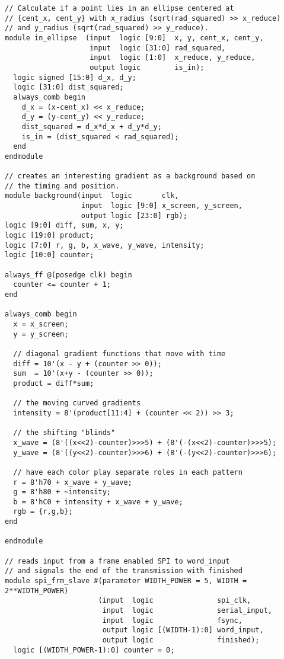 \documentclass{article}
\begin{document}
\begin{verbatim}
// Calculate if a point lies in an ellipse centered at 
// {cent_x, cent_y} with x_radius (sqrt(rad_squared) >> x_reduce)
// and y_radius (sqrt(rad_squared) >> y_reduce).
module in_ellipse  (input  logic [9:0]  x, y, cent_x, cent_y,
                    input  logic [31:0] rad_squared,
                    input  logic [1:0]  x_reduce, y_reduce,
                    output logic        is_in);
  logic signed [15:0] d_x, d_y;
  logic [31:0] dist_squared;
  always_comb begin
    d_x = (x-cent_x) << x_reduce;
    d_y = (y-cent_y) << y_reduce;
    dist_squared = d_x*d_x + d_y*d_y;
    is_in = (dist_squared < rad_squared);
  end
endmodule

// creates an interesting gradient as a background based on
// the timing and position.
module background(input  logic       clk,
                  input  logic [9:0] x_screen, y_screen,
                  output logic [23:0] rgb);
logic [9:0] diff, sum, x, y;
logic [19:0] product; 
logic [7:0] r, g, b, x_wave, y_wave, intensity;
logic [10:0] counter;

always_ff @(posedge clk) begin
  counter <= counter + 1;
end

always_comb begin
  x = x_screen;
  y = y_screen;
  
  // diagonal gradient functions that move with time
  diff = 10'(x - y + (counter >> 0));
  sum  = 10'(x+y - (counter >> 0));
  product = diff*sum;
  
  // the moving curved gradients
  intensity = 8'(product[11:4] + (counter << 2)) >> 3;
  
  // the shifting "blinds" 
  x_wave = (8'((x<<2)-counter)>>>5) + (8'(-(x<<2)-counter)>>>5);
  y_wave = (8'((y<<2)-counter)>>>6) + (8'(-(y<<2)-counter)>>>6);
  
  // have each color play separate roles in each pattern
  r = 8'h70 + x_wave + y_wave;
  g = 8'h80 + ~intensity;
  b = 8'hC0 + intensity + x_wave + y_wave;
  rgb = {r,g,b};
end

endmodule

// reads input from a frame enabled SPI to word_input
// and signals the end of the transmission with finished
module spi_frm_slave #(parameter WIDTH_POWER = 5, WIDTH = 2**WIDTH_POWER)
                      (input  logic               spi_clk,
                       input  logic               serial_input,
                       input  logic               fsync,
                       output logic [(WIDTH-1):0] word_input,
                       output logic               finished);
  logic [(WIDTH_POWER-1):0] counter = 0;
  

\end{verbatim}
\end{document}
